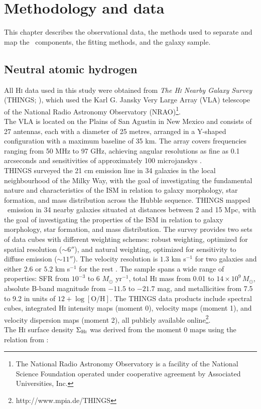 \chapter[Methodology and data]{Methodology and data}

This chapter describes the observational data, the methods used to separate and map the \HI\ components, the fitting methods, and the galaxy sample.

\section{Neutral atomic hydrogen}

All \textrm{H\textsc{i}} data used in this study were obtained from \textit{The \textrm{H\textsc{i}} Nearby Galaxy Survey} (THINGS; \citealt{things}), which used the Karl G. Jansky Very Large Array (VLA) telescope of the National Radio Astronomy Observatory (NRAO)\footnote{The National Radio Astronomy Observatory is a facility of the National Science Foundation operated under cooperative agreement by Associated Universities, Inc.}.\\\indent
The VLA is located on the Plains of San Agustin in New Mexico and consists of 27 antennas, each with a diameter of 25 metres, arranged in a Y-shaped configuration with a maximum baseline of 35 km. The array covers frequencies ranging from 50 MHz to 97 GHz, achieving angular resolutions as fine as 0.1 arcseconds and sensitivities of approximately 100 microjanskys \citep{vla1980}.\\\indent
THINGS surveyed the 21 cm emission line in 34 galaxies in the local neighbourhood of the Milky Way, with the goal of investigating the fundamental nature and characteristics of the ISM in relation to galaxy morphology, star formation, and mass distribution across the Hubble sequence. THINGS mapped \HI\ emission in 34 nearby galaxies situated at distances between 2 and 15 Mpc, with the goal of investigating the properties of the ISM in relation to galaxy morphology, star formation, and mass distribution. The survey provides two sets of data cubes with different weighting schemes: robust weighting, optimized for spatial resolution ($\sim 6''$), and natural weighting, optimized for sensitivity to diffuse emission ($\sim 11''$). The velocity resolution is $1.3$ km s$^{-1}$ for two galaxies and either $2.6$ or $5.2$ km s$^{-1}$ for the rest \citep{Walter2008}. The sample spans a wide range of properties: SFR from $10^{-3}$ to 6 $M_\odot$ yr$^{-1}$, total \textrm{H\textsc{i}} mass from 0.01 to $14 \times 10^9\,M_\odot$, absolute B-band magnitude from $-11.5$ to $-21.7$ mag, and metallicities from 7.5 to 9.2 in units of $12 + \log[\mathrm{O/H}]$. The THINGS data products include spectral cubes, integrated \textrm{H\textsc{i}} intensity maps (moment 0), velocity maps (moment 1), and velocity dispersion maps (moment 2), all publicly available online\footnote{http://www.mpia.de/THINGS}.\\\indent
The \textrm{H\textsc{i}} surface density $\Sigma_{\textrm{H\textsc{i}}}$ was derived from the moment 0 maps using the relation from \citet{Leroy2008}:

